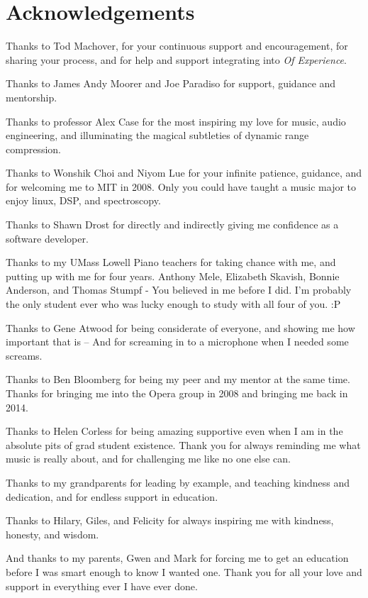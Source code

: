 \chapter*{Acknowledgements}
\label{ch:acknowledgements}

Thanks to Tod Machover, for your continuous support and encouragement,
for sharing your process, and for help and support integrating \thesis
into \textit{Of Experience}.

Thanks to James Andy Moorer and Joe Paradiso for support, guidance and
mentorship.

Thanks to professor Alex Case for the most inspiring my love for
music, audio engineering, and illuminating the magical subtleties of
dynamic range compression.

Thanks to Wonshik Choi and Niyom Lue for your infinite patience,
guidance, and for welcoming me to MIT in 2008. Only you could have
taught a music major to enjoy linux, DSP, and spectroscopy.

Thanks to Shawn Drost for directly and indirectly giving me confidence
as a software developer.

Thanks to my UMass Lowell Piano teachers for taking chance with me,
and putting up with me for four years. Anthony Mele, Elizabeth
Skavish, Bonnie Anderson, and Thomas Stumpf - You believed in me
before I did. I'm probably the only student ever who was lucky enough
to study with all four of you. :P

Thanks to Gene Atwood for being considerate of everyone, and showing
me how important that is -- And for screaming in to a microphone when
I needed some screams.

Thanks to Ben Bloomberg for being my peer and my mentor at the same
time. Thanks for bringing me into the Opera group in 2008 and bringing
me back in 2014.

Thanks to Helen Corless for being amazing supportive even when I am in
the absolute pits of grad student existence. Thank you for always
reminding me what music is really about, and for challenging me like
no one else can.

Thanks to my grandparents for leading by example, and teaching
kindness and dedication, and for endless support in education.

Thanks to Hilary, Giles, and Felicity for always inspiring me with
kindness, honesty, and wisdom. 

And thanks to my parents, Gwen and Mark for forcing me to get an
education before I was smart enough to know I wanted one. Thank you for
all your love and support in everything ever I have ever done.

